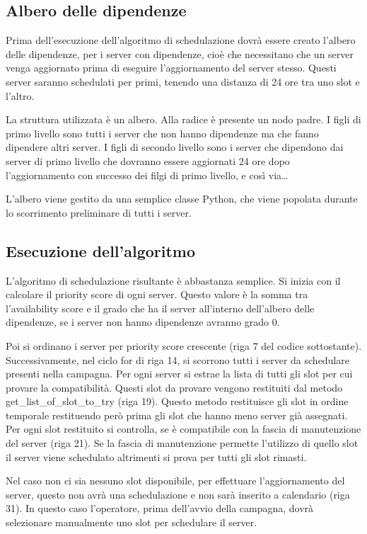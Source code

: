 \subsection{Albero delle dipendenze}
Prima dell’esecuzione dell’algoritmo di schedulazione dovrà essere creato 
l’albero delle dipendenze, per i server con dipendenze, cioè che necessitano 
che un server venga aggiornato prima di eseguire l’aggiornamento del server 
stesso. Questi server saranno schedulati per primi, tenendo una distanza di 24 
ore tra uno slot e l’altro.

La struttura utilizzata è un albero. Alla radice è presente un nodo padre. 
I figli di primo livello sono tutti i server che non hanno dipendenze ma che 
fanno dipendere altri server.
I figli di secondo livello sono i server che dipendono dai server di primo livello
che dovranno essere aggiornati 24 ore dopo l'aggiornamento con successo dei filgi 
di primo livello, e così via\dots

L’albero viene gestito da una semplice classe Python, che viene popolata durante 
lo scorrimento preliminare di tutti i server.


\subsection{Esecuzione dell’algoritmo}
L’algoritmo di schedulazione risultante è abbastanza semplice. 
Si inizia con il calcolare il priority score di ogni server.
Questo valore è la somma tra l’availability score e il grado che 
ha il server all'interno dell’albero delle dipendenze, se i server non 
hanno dipendenze avranno grado 0.

Poi si ordinano i server per priority score crescente (riga 7 del codice sottostante).
Successivamente, nel ciclo for di riga 14, si scorrono tutti i server 
da schedulare presenti nella campagna.
Per ogni server si estrae la lista di tutti gli slot per cui provare 
la compatibilità. Questi slot da provare vengono restituiti dal metodo 
get\_list\_of\_slot\_to\_try (riga 19). Questo metodo restituisce gli slot 
in ordine temporale restituendo però prima gli slot che hanno meno server 
già assegnati.
Per ogni slot restituito si controlla, se è compatibile con la fascia di 
manutenzione del server (riga 21). Se la fascia di manutenzione permette 
l’utilizzo di quello slot il server viene schedulato altrimenti si prova 
per tutti gli slot rimasti.

Nel caso non ci sia nessuno slot disponibile, per effettuare 
l’aggiornamento del server, questo non avrà una schedulazione e non sarà 
inserito a calendario (riga 31). In questo caso l’operatore, prima 
dell’avvio della campagna, dovrà selezionare manualmente uno slot per 
schedulare il server.\\

